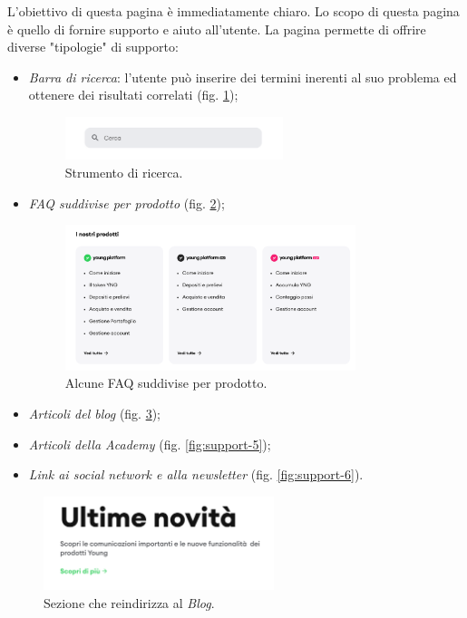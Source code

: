 L'obiettivo di questa pagina è immediatamente chiaro. Lo scopo di questa 
pagina è quello di fornire supporto e aiuto all'utente. La pagina permette 
di offrire diverse "tipologie" di supporto:
\begin{itemize}
  \item \textit{Barra di ricerca}: l'utente può inserire dei termini 
  inerenti al suo problema ed ottenere dei risultati correlati 
  (fig. \ref{fig:support-2});

  \begin{figure}[H]
    \centering
    \includegraphics[width=0.60\textwidth]{res/images/internal-pages/support/support-2.png}
    \caption{Strumento di ricerca.}
    \label{fig:support-2}
  \end{figure}
  
  \item \textit{FAQ suddivise per prodotto} (fig. \ref{fig:support-3});
  
  \begin{figure}[H]
    \centering
    \includegraphics[width=0.80\textwidth]{res/images/internal-pages/support/support-3.png}
    \caption{Alcune FAQ suddivise per prodotto.}
    \label{fig:support-3}
  \end{figure}
  
  \item \textit{Articoli del blog} (fig. \ref{fig:support-4});
  
  \item \textit{Articoli della Academy} (fig. \ref{fig:support-5});
  
  \item \textit{Link ai social network e alla newsletter} 
  (fig. \ref{fig:support-6}).
\end{itemize}

\begin{figure}[H]
  \centering
  \includegraphics[width=0.60\textwidth]{res/images/internal-pages/support/support-4.png}
  \caption{Sezione che reindirizza al \textit{Blog}.}
  \label{fig:support-4}
\end{figure}

